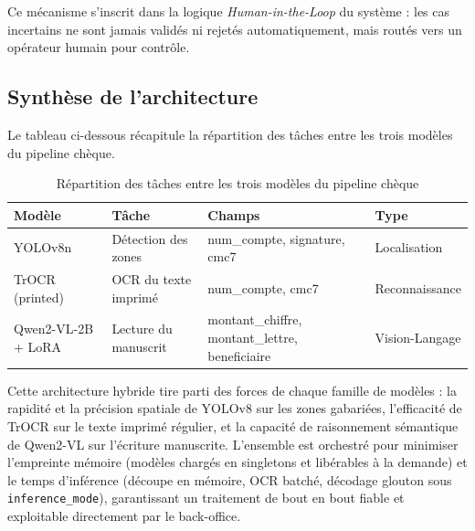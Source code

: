 Ce mécanisme s'inscrit dans la logique \textit{Human-in-the-Loop} du
système : les cas incertains ne sont jamais validés ni rejetés
automatiquement, mais routés vers un opérateur humain pour contrôle.

\subsection*{Synthèse de l'architecture}

Le tableau ci-dessous récapitule la répartition des tâches entre les trois
modèles du pipeline chèque.

\begin{table}[H]
\centering
\label{tab:synthese_cheque}
\begin{tabular}{|p{3.0cm}|p{3.4cm}|p{4.2cm}|p{2.4cm}|}
\hline
\textbf{Modèle} & \textbf{Tâche} & \textbf{Champs} & \textbf{Type} \\
\hline
YOLOv8n &
Détection des zones &
num\_compte, signature, cmc7 &
Localisation \\
\hline
TrOCR (printed) &
OCR du texte imprimé &
num\_compte, cmc7 &
Reconnaissance \\
\hline
Qwen2-VL-2B + LoRA &
Lecture du manuscrit &
montant\_chiffre, montant\_lettre, beneficiaire &
Vision-Langage \\
\hline
\end{tabular}
\caption{Répartition des tâches entre les trois modèles du pipeline chèque}
\end{table}

Cette architecture hybride tire parti des forces de chaque famille de
modèles : la rapidité et la précision spatiale de YOLOv8 sur les zones
gabariées, l'efficacité de TrOCR sur le texte imprimé régulier, et la
capacité de raisonnement sémantique de Qwen2-VL sur l'écriture manuscrite.
L'ensemble est orchestré pour minimiser l'empreinte mémoire (modèles
chargés en singletons et libérables à la demande) et le temps d'inférence
(découpe en mémoire, OCR batché, décodage glouton sous
\texttt{inference\_mode}), garantissant un traitement de bout en bout fiable
et exploitable directement par le back-office.
